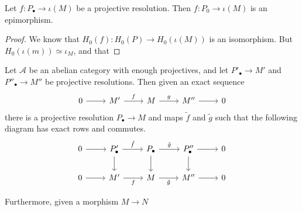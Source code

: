 \documentclass[main.tex]{subfiles}
\begin{document}
\begin{lemma}
  \label{lemma:projective_resolution_epimorphism}
  Let $f\colon P_{\bullet} \to \iota(M)$ be a projective resolution. Then $f\colon P_{0} \to \iota(M)$ is an epimorphism.
\end{lemma}
\begin{proof}
  We know that $H_{0}(f)\colon H_{0}(P) \to H_{0}(\iota (M))$ is an isomorphism. But $H_{0}(\iota(m)) \simeq \iota_{M}$, and that 
\end{proof}

\begin{theorem}
  \label{thm:extended_horseshoe_lemma}
  Let $\mathcal{A}$ be an abelian category with enough projectives, and let $P'_{\bullet} \to M'$ and $P''_{\bullet} \to M''$ be projective resolutions. Then given an exact sequence
  \begin{equation*}
    \begin{tikzcd}
      0
      \arrow[r]
      & M'
      \arrow[r, "f"]
      & M
      \arrow[r, "g"]
      & M''
      \arrow[r]
      & 0
    \end{tikzcd}
  \end{equation*}
  there is a projective resolution $P_{\bullet} \to M$ and maps $\tilde{f}$ and $\tilde{g}$ such that the following diagram has exact rows and commutes.
  \begin{equation*}
    \begin{tikzcd}
      0
      \arrow[r]
      & P'_{\bullet}
      \arrow[r, "\tilde{f}"]
      \arrow[d]
      & P_{\bullet}
      \arrow[r, "\tilde{g}"]
      \arrow[d]
      & P''_{\bullet}
      \arrow[r]
      \arrow[d]
      & 0
      \\
      0
      \arrow[r]
      & M'
      \arrow[r, swap, "f"]
      & M
      \arrow[r, swap, "\tilde{g}"]
      & M''
      \arrow[r]
      & 0
    \end{tikzcd}
  \end{equation*}

  Furthermore, given a morphism $M \to N$
\end{theorem}
\end{document}
